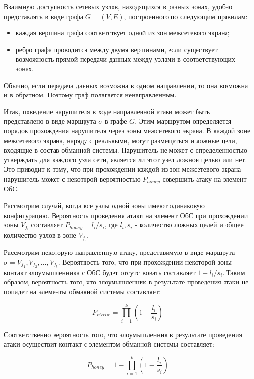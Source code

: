 Взаимную доступность сетевых узлов, находящихся в разных зонах, удобно представлять в виде графа $G = (V, E)$, построенного по следующим правилам:

\begin{itemize}
	\item каждая вершина графа соответствует одной из зон межсетевого экрана;
	\item ребро графа проводится между двумя вершинами, если существует возможность прямой передачи данных между узлами в соответствующих зонах.
\end{itemize}

Обычно, если передача данных возможна в одном направлении, то она возможна и в обратном. Поэтому граф полагается ненаправленным.

Итак, поведение нарушителя в ходе направленной атаки может быть представлено в виде маршрута $\sigma$ в графе $G$. Этим маршрутом определяется порядок прохождения нарушителя через зоны межсетевого экрана. В каждой зоне межсетевого экрана, наряду с реальными, могут размещаться и ложные цели, входящие в состав обманной системы. Нарушитель не может с определенностью утверждать для каждого узла сети, является ли этот узел ложной целью или нет. Это приводит к тому, что при прохождении каждой из зон межсетевого экрана нарушитель может с некоторой вероятностью $P_{honey}$ совершить атаку на элемент ОбС.

Рассмотрим случай, когда все узлы одной зоны имеют одинаковую конфигурацию. Вероятность проведения атаки на элемент ОбС при прохождении зоны $V_{f_i}$ составляет $P_{honey} = l_i / s_i$, где $l_i, s_i$ - количество ложных целей и общее количество узлов в зоне $V_{f_i}$.

Рассмотрим некоторую направленную атаку, представимую в виде маршрута $\sigma = V_{f_1}, V_{f_2}, ... , V_{f_k}$. Вероятность того, что при прохождении некоторой зоны  контакт злоумышленника с ОбС будет отсутствовать составляет $ 1 - l_i / s_i$. Таким образом, вероятность того, что злоумышленник в результате проведения атаки  не попадет на элементы обманной системы составляет:

\begin{equation}
P_{victim} = \prod_{i=1}^k (1 - \frac{l_i}{s_i})
\end{equation}

Соответственно вероятность того, что злоумышленник в результате проведения атаки осуществит контакт с элементом обманной системы составляет:

\begin{equation}
\label{eq:p_honey}
P_{honey} = 1 - \prod_{i=1}^k (1 - \frac{l_i}{s_i})
\end{equation}

